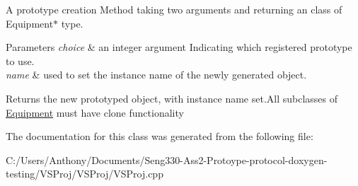 A prototype creation Method taking two arguments and returning an class of Equipment$\ast$ type. 


\begin{DoxyParams}{Parameters}
{\em choice} & an integer argument Indicating which registered prototype to use. \\
\hline
{\em name} & used to set the instance name of the newly generated object. \\
\hline
\end{DoxyParams}
\begin{DoxyReturn}{Returns}
the new prototyped object, with instance name set.\+All subclasses of \hyperlink{class_equipment}{Equipment} must have clone functionality 
\end{DoxyReturn}


The documentation for this class was generated from the following file\+:\begin{DoxyCompactItemize}
\item 
C\+:/\+Users/\+Anthony/\+Documents/\+Seng330-\/\+Ass2-\/\+Protoype-\/protocol-\/doxygen-\/testing/\+V\+S\+Proj/\+V\+S\+Proj/V\+S\+Proj.\+cpp\end{DoxyCompactItemize}
